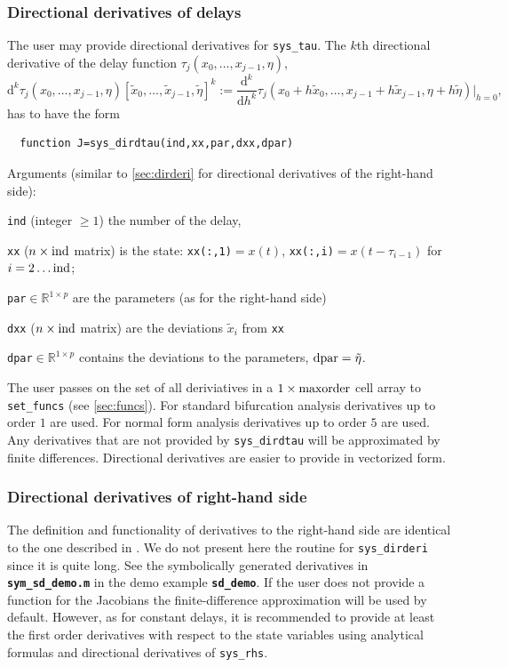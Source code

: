 \documentclass[10pt]{scrartcl}
\newcommand{\file}[1]{\textbf{\texttt{#1}}}
\renewcommand{\d}{\mathrm{d}}
\newcommand{\RR}{\mathbb{R}}
\newcommand{\blist}[1]{\mbox{\lstinline!#1!}}
\begin{document}
\subsubsection{Directional derivatives of delays}
\label{sec:dirdtau}
The user may provide directional derivatives for \blist{sys_tau}. The $k$th directional
derivative of the delay function $\tau_j(x_0,\ldots,x_{j-1},\eta)$,
\begin{displaymath}
  \d^k\tau_j(x_0,\ldots,x_{j-1},\eta)[\tilde{x}_0,\ldots,\tilde{x}_{j-1},\tilde{\eta}]^k:=
  \frac{\d^k}{\d h^k}\tau_j(x_0+h\tilde{x}_0,\ldots,x_{j-1}+h\tilde{x}_{j-1},\eta+h\tilde{\eta})\vert_{h=0}\mbox{,}
\end{displaymath}
 has to have the form
\begin{lstlisting}
  function J=sys_dirdtau(ind,xx,par,dxx,dpar)
\end{lstlisting}
Arguments (similar to \cref{sec:dirderi} for directional derivatives of the right-hand side):
\begin{compactitem}
\item \blist{ind} (integer $\geq1$) the number of the delay,
\item \blist{xx} ($n\times\blist{ind}$ matrix) is the state:
  \blist{xx(:,1)}$=x(t)$, \blist{xx(:,i)}$=x(t-\tau_{i-1})$ for
  $i=2\ldots\blist{ind}$;
\item \blist{par}$\in\RR^{1\times p}$ are the parameters (as for the right-hand side)
\item \blist{dxx} ($n\times\blist{ind}$ matrix) are the deviations $\tilde{x}_i$ from \blist{xx}
\item \blist{dpar}$\in\RR^{1\times
  p}$ contains the deviations to the parameters, $\blist{dpar}=\tilde{\eta}$.
\end{compactitem}
The user passes on the set of all deriviatives in a
$1\times\blist{maxorder}$ cell array to \blist{set_funcs} (see
\cref{sec:funcs}). For standard bifurcation analysis derivatives up to
order $1$ are used. For normal form analysis derivatives up to order
$5$ are used. Any derivatives that are not provided by
\blist{sys_dirdtau} will be approximated by finite differences.
Directional derivatives are easier to provide in vectorized form.

\subsubsection{Directional derivatives of right-hand
  side}
\label{sec:sdjac}
The definition and functionality of derivatives to the right-hand side
are identical to the one described in .  We do not
present here the routine for \blist{sys_dirderi} since it is quite
long. See the symbolically generated derivatives in
\file{sym\_sd\_demo.m} in the demo example \file{sd\_demo}. If the
user does not provide a function for the Jacobians the
finite-difference approximation will be used by default.  However, as
for constant delays, it is recommended to provide at least the first
order derivatives with respect to the state variables using analytical
formulas and directional derivatives of \blist{sys_rhs}.
\end{document}
